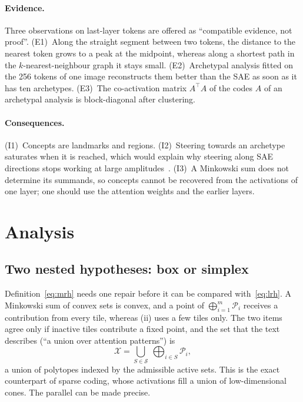 \documentclass[sigconf,nonacm,screen]{acmart}
\newcommand{\bigmsum}{\bigoplus}
\newcommand{\X}{\mathcal{X}}
\newcommand{\cP}{\mathcal{P}}
\newcommand{\cS}{\mathcal{S}}
\begin{document}
\paragraph{Evidence.} Three observations on last-layer tokens are offered as ``compatible evidence, not
proof''. (E1)~Along the straight segment between two tokens, the distance to the nearest token grows to a
peak at the midpoint, whereas along a shortest path in the $k$-nearest-neighbour graph it stays small.
(E2)~Archetypal analysis fitted on the 256 tokens of one image reconstructs them better than the SAE as
soon as it has ten archetypes. (E3)~The co-activation matrix $A^\top A$ of the codes $A$ of an archetypal
analysis is block-diagonal after clustering.

\paragraph{Consequences.} (I1)~Concepts are landmarks and regions. (I2)~Steering towards an archetype
saturates when it is reached, which would explain why steering along SAE directions stops working at
large amplitudes~\cite{templeton2024scaling}. (I3)~A Minkowski sum does not determine its summands, so
concepts cannot be recovered from the activations of one layer; one should use the attention weights and
the earlier layers.

\section{Analysis}
\label{sec:analysis}

\subsection{Two nested hypotheses: box or simplex}
\label{sec:nested}

Definition~\eqref{eq:mrh} needs one repair before it can be compared with~\eqref{eq:lrh}. A Minkowski sum
of convex sets is convex, and a point of $\bigmsum_{i=1}^m\cP_i$ receives a contribution from every tile,
whereas (ii) uses a few tiles only. The two items agree only if inactive tiles contribute a fixed point,
and the set that the text describes (``a union over attention patterns'') is
\begin{equation}
  \X=\bigcup_{S\in\cS}\ \bigmsum_{i\in S}\cP_i ,
  \label{eq:union}
\end{equation}
a union of polytopes indexed by the admissible active sets. This is the exact counterpart of sparse
coding, whose activations fill a union of low-dimensional cones. The parallel can be made precise.
\end{document}
